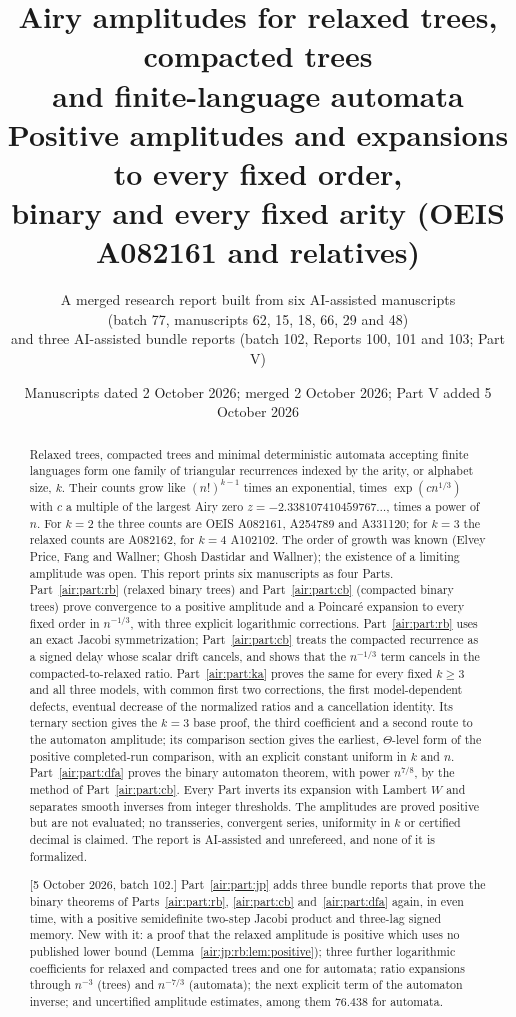 \documentclass[11pt,letterpaper]{article}
\title{Airy amplitudes for relaxed trees, compacted trees\\ and finite-language automata\\[4pt]
\large Positive amplitudes and expansions to every fixed order,\\ binary and every fixed arity (OEIS A082161 and relatives)}
\author{A merged research report built from six AI-assisted manuscripts\\
(batch 77, manuscripts 62, 15, 18, 66, 29 and 48)\\
and three AI-assisted bundle reports (batch 102, Reports 100, 101 and 103; Part V)}
\date{Manuscripts dated 2 October 2026; merged 2 October 2026; Part V added 5 October 2026}
\numberwithin{equation}{section}
\theoremstyle{remark}
\begin{document}
\maketitle
\begin{abstract}
Relaxed trees, compacted trees and minimal deterministic automata accepting finite languages form one family of triangular recurrences indexed by the arity, or alphabet size, $k$. Their counts grow like $(n!)^{k-1}$ times an exponential, times $\exp(cn^{1/3})$ with $c$ a multiple of the largest Airy zero $z=-2.338107410459767\ldots$, times a power of $n$. For $k=2$ the three counts are OEIS A082161, A254789 and A331120; for $k=3$ the relaxed counts are A082162, for $k=4$ A102102. The order of growth was known (Elvey Price, Fang and Wallner; Ghosh Dastidar and Wallner); the existence of a limiting amplitude was open. This report prints six manuscripts as four Parts. Part~\ref{air:part:rb} (relaxed binary trees) and Part~\ref{air:part:cb} (compacted binary trees) prove convergence to a positive amplitude and a Poincar\'e expansion to every fixed order in $n^{-1/3}$, with three explicit logarithmic corrections. Part~\ref{air:part:rb} uses an exact Jacobi symmetrization; Part~\ref{air:part:cb} treats the compacted recurrence as a signed delay whose scalar drift cancels, and shows that the $n^{-1/3}$ term cancels in the compacted-to-relaxed ratio. Part~\ref{air:part:ka} proves the same for every fixed $k\ge3$ and all three models, with common first two corrections, the first model-dependent defects, eventual decrease of the normalized ratios and a cancellation identity. Its ternary section gives the $k=3$ base proof, the third coefficient and a second route to the automaton amplitude; its comparison section gives the earliest, $\Theta$-level form of the positive completed-run comparison, with an explicit constant uniform in $k$ and $n$. Part~\ref{air:part:dfa} proves the binary automaton theorem, with power $n^{7/8}$, by the method of Part~\ref{air:part:cb}. Every Part inverts its expansion with Lambert $W$ and separates smooth inverses from integer thresholds. The amplitudes are proved positive but are not evaluated; no transseries, convergent series, uniformity in $k$ or certified decimal is claimed. The report is AI-assisted and unrefereed, and none of it is formalized.

[5 October 2026, batch 102.] Part~\ref{air:part:jp} adds three bundle reports that prove the binary theorems of Parts~\ref{air:part:rb}, \ref{air:part:cb} and~\ref{air:part:dfa} again, in even time, with a positive semidefinite two-step Jacobi product and three-lag signed memory. New with it: a proof that the relaxed amplitude is positive which uses no published lower bound (Lemma~\ref{air:jp:rb:lem:positive}); three further logarithmic coefficients for relaxed and compacted trees and one for automata; ratio expansions through $n^{-3}$ (trees) and $n^{-7/3}$ (automata); the next explicit term of the automaton inverse; and uncertified amplitude estimates, among them $76.438$ for automata.
\end{abstract}
\setcounter{tocdepth}{1}
\tableofcontents
\newpage
\end{document}
